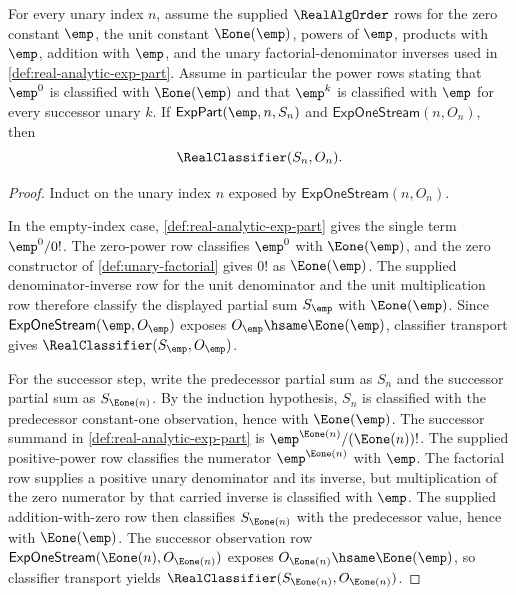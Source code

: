 \begin{lemma}
\label{lem:real-analytic-exp-part-empty-input-constant-one}
For every unary index $n$, assume the supplied $\RealAlgOrder$ rows for the zero constant $\emp$, the unit constant $\Eone(\emp)$, powers of $\emp$, products with $\emp$, addition with $\emp$, and the unary factorial-denominator inverses used in \autoref{def:real-analytic-exp-part}. Assume in particular the power rows stating that $\emp^0$ is classified with $\Eone(\emp)$ and that $\emp^k$ is classified with $\emp$ for every successor unary $k$. If $\mathsf{ExpPart}(\emp,n,S_n)$ and $\mathsf{ExpOneStream}(n,O_n)$, then
$$
\RealClassifier(S_n,O_n).
$$
\end{lemma}
\begin{proof}
Induct on the unary index $n$ exposed by $\mathsf{ExpOneStream}(n,O_n)$.

In the empty-index case, \autoref{def:real-analytic-exp-part} gives the single term $\emp^0/0!$. The zero-power row classifies $\emp^0$ with $\Eone(\emp)$, and the zero constructor of \autoref{def:unary-factorial} gives $0!$ as $\Eone(\emp)$. The supplied denominator-inverse row for the unit denominator and the unit multiplication row therefore classify the displayed partial sum $S_{\emp}$ with $\Eone(\emp)$. Since $\mathsf{ExpOneStream}(\emp,O_{\emp})$ exposes $O_{\emp}\hsame\Eone(\emp)$, classifier transport gives $\RealClassifier(S_{\emp},O_{\emp})$.

For the successor step, write the predecessor partial sum as $S_n$ and the successor partial sum as $S_{\Eone(n)}$. By the induction hypothesis, $S_n$ is classified with the predecessor constant-one observation, hence with $\Eone(\emp)$. The successor summand in \autoref{def:real-analytic-exp-part} is $\emp^{\Eone(n)}/(\Eone(n))!$. The supplied positive-power row classifies the numerator $\emp^{\Eone(n)}$ with $\emp$. The factorial row supplies a positive unary denominator and its inverse, but multiplication of the zero numerator by that carried inverse is classified with $\emp$. The supplied addition-with-zero row then classifies $S_{\Eone(n)}$ with the predecessor value, hence with $\Eone(\emp)$. The successor observation row $\mathsf{ExpOneStream}(\Eone(n),O_{\Eone(n)})$ exposes $O_{\Eone(n)}\hsame\Eone(\emp)$, so classifier transport yields $\RealClassifier(S_{\Eone(n)},O_{\Eone(n)})$.
\end{proof}

